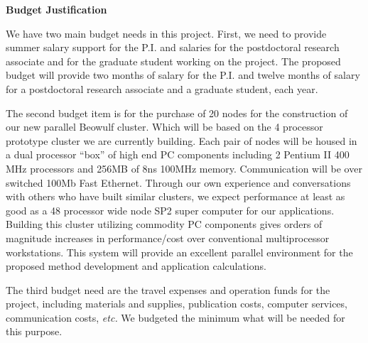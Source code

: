 \setlength{\textwidth}{7in}
\setlength{\textheight}{9.25in}
\setlength{\oddsidemargin}{-.25in}
%
\setlength{\topmargin}{-.9in}
\def\Real{\rm I\hspace{-0.2em}R}
\def\nin{{\in \! \! \! \! \! /} \,}
\def\nequiv{{\equiv \! \! \! \! \! \! /} \,}




\setcounter{page}{32}

\begin{center}
{\Large 
\bf 
Budget Justification}
\end{center}
 
\vspace{2mm}

\setlength{\baselineskip}{2em}

We have two main budget needs in this project. First, we
need to provide summer salary support for the P.I.
and salaries 
for  the postdoctoral research associate
and 
for the graduate student
working on the project.
The proposed budget will provide two months of salary for the
P.I. and twelve months of salary for a 
postdoctoral research associate and a graduate student,
each year.


The second budget item is for the purchase of
20  nodes for the construction of our new parallel Beowulf cluster.
Which will be based on the 4 processor prototype cluster we
are currently building.
Each pair of nodes
will be housed in a dual processor ``box'' of high end 
PC components including 2 Pentium II 400 MHz processors and 
256MB of 8ns 100MHz memory. Communication will be over 
switched 100Mb Fast Ethernet. Through our own experience
and conversations with others who have built similar clusters,
we expect performance at least as good as a 48 processor
wide node SP2 super computer for our applications. Building this 
cluster  utilizing commodity PC components gives orders of
magnitude increases in performance/cost over conventional
multiprocessor workstations.
This system 
will provide an excellent parallel environment for the 
proposed method development and application calculations.

The third budget need are the travel expenses and
operation funds for the project, including materials
and supplies, publication costs, computer services,
communication costs, {\it etc.}
We budgeted the minimum what will be needed for this 
purpose.






